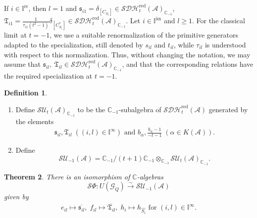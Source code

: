 \documentclass[12pt]{amsart}
\newtheorem{theorem}{Theorem}[section]
\theoremstyle{definition}
\newtheorem{definition}[theorem]{Definition}
\numberwithin{equation}{section}
\begin{document}
If $ i \in \mathbb{I}^{\mathrm{re}} $, then $ l = 1 $ and $ \mathfrak{s}_{i1} = \delta_{[C_{S_i}]} \in \mathcal{SDH}_t^{\mathrm{red}}(\mathcal{A})_{\mathbb{C}_{-1}} $, $ \mathfrak{T}_{i1} = \frac{1}{\tau_{i1}(t^2-1)} \delta_{[C_{S_i}^*]} \in \mathcal{SDH}_t^{\mathrm{red}}(\mathcal{A})_{\mathbb{C}_{-1}} $. 
Let $ i \in \mathbb{I}^{\mathrm{im}} $ and $ l \geqslant 1 $. 
For the classical limit at $ t=-1 $, we use a suitable renormalization of the primitive
generators adapted to the specialization, still denoted by $ s_{il} $ and $ t_{il} $, while $ \tau_{il} $ is understood with respect to this normalization. 
Thus, without changing the notation, we may assume that $  \mathfrak{s}_{il},\ \mathfrak{T}_{il}
    \in
    \mathcal{SDH}_t^{\mathrm{red}}(\mathcal A)_{\mathbb C_{-1}} $, and that the corresponding relations have the required specialization at $ t=-1 $. 

\begin{definition}\;
\label{Definition of SU-1}

\begin{enumerate}
        \item Define $ \mathcal{SU}_t(\mathcal{A})_{\mathbb{C}_{-1}} $ to be the $ \mathbb{C}_{-1} $-subalgebra of $ \mathcal{SDH}_t^{\mathrm{red}}(\mathcal{A}) $ generated by the elements
    \begin{align*}
        \mathfrak{s}_{il}, \mathfrak{T}_{il}\;((i,l) \in \mathbb{I}^{\infty}) \text{ and } b_{\alpha},\frac{b_{\alpha}-1}{-t-1}\;(\alpha \in K(\mathcal{A})).
    \end{align*}
    
       \item  Define
    \[\mathcal{SU}_{-1}(\mathcal{A}) =  \mathbb{C}_{-1}/(t+1)\mathbb{C}_{-1} \otimes_{\mathbb{C}_{-1}} \mathcal{SU}_t(\mathcal{A})_{\mathbb{C}_{-1}}.\]
    \end{enumerate}
    \end{definition}





\begin{theorem}
    \label{SPhi to SU-1}
    There is an isomorphism of $ \mathbb{C} $-algebras
    \[ \mathcal{S}\Phi: U(\mathcal{G}_Q) \xrightarrow{\sim} \mathcal{SU}_{-1}(\mathcal{A}) \]
    given by
    \begin{align*}
        e_{il} \mapsto \overline{\mathfrak{s}_{il}},\; f_{il} \mapsto \overline{\mathfrak{T}_{il}},\; h_i \mapsto h_{\widehat{S_i}} \text{ for } (i,l) \in \mathbb{I}^{\infty}.
    \end{align*}    
\end{theorem}
\end{document}
